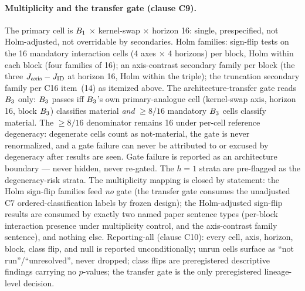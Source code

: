 \paragraph{Multiplicity and the transfer gate (clause C9).}
The primary cell is $B_{1}$ $\times$ kernel-swap $\times$ horizon 16: single,
prespecified, not Holm-adjusted, not overridable by secondaries. Holm
families: sign-flip tests on the 16 mandatory interaction cells (4 axes
$\times$ 4 horizons) per block, Holm within each block (four families of 16);
an axis-contrast secondary family per block (the three
$J_{\mathrm{axis}} - J_{\mathrm{ID}}$ at horizon 16, Holm within the
triple); the truncation secondary family per C16 item~(14) as itemized above.
The architecture-transfer gate reads $B_{3}$ only: $B_{3}$ passes iff
$B_{3}$'s own primary-analogue cell (kernel-swap axis, horizon 16, block
$B_{3}$) classifies material \emph{and} $\ge 8/16$ mandatory $B_{3}$ cells
classify material. The $\ge 8/16$ denominator remains 16 under per-cell
reference degeneracy: degenerate cells count as not-material, the gate is
never renormalized, and a gate failure can never be attributed to or excused
by degeneracy after results are seen. Gate failure is reported as an
architecture boundary --- never hidden, never re-gated. The $h=1$ strata are
pre-flagged as the degeneracy-risk strata. The multiplicity mapping is closed
by statement: the Holm sign-flip families feed \emph{no} gate (the transfer
gate consumes the unadjusted C7 ordered-classification labels by frozen
design); the Holm-adjusted sign-flip results are consumed by exactly two
named paper sentence types (per-block interaction presence under
multiplicity control, and the axis-contrast family sentence), and nothing
else. Reporting-all (clause C10): every cell, axis, horizon, block, class
flip, and null is reported unconditionally; unrun cells surface as
``not run''/``unresolved'', never dropped; class flips are preregistered
descriptive findings carrying no $p$-values; the transfer gate is the only
preregistered lineage-level decision.

